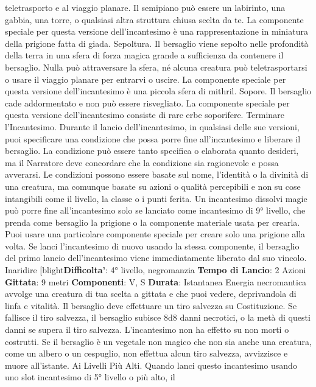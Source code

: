 \begin{multicols}{2}
teletrasporto e al viaggio planare. Il semipiano può
essere un labirinto, una gabbia, una torre, o qualsiasi
altra struttura chiusa scelta da te.
La componente speciale per questa versione
dell’incantesimo è una rappresentazione in miniatura
della prigione fatta di giada.
Sepoltura. Il bersaglio viene sepolto nelle profondità
della terra in una sfera di forza magica grande a
sufficienza da
contenere il bersaglio. Nulla può attraversare la sfera,
né alcuna creatura può teletrasportarsi o usare il
viaggio planare per entrarvi o uscire.
La componente speciale per questa versione
dell’incantesimo è una piccola sfera di mithril.
Sopore. Il bersaglio cade addormentato e non può
essere risvegliato. La componente speciale per questa
versione dell’incantesimo consiste di rare erbe
soporifere.
Terminare l’Incantesimo. Durante il lancio
dell’incantesimo, in qualsiasi delle sue versioni, puoi
specificare una condizione che possa porre fine
all’incantesimo e liberare il bersaglio. La condizione può
essere tanto specifica o elaborata quanto desideri, ma il
Narratore deve concordare che la condizione sia ragionevole
e possa avverarsi. Le condizioni possono essere
basate sul nome, l’identità o la divinità di una creatura,
ma comunque basate su azioni o qualità percepibili e
non su cose intangibili come il livello, la classe o i punti
ferita.
Un incantesimo dissolvi magie può porre fine
all’incantesimo solo se lanciato come incantesimo di 9°
livello, che prenda come bersaglio la prigione o la
componente materiale usata per crearla.
Puoi usare una particolare componente speciale per
creare solo una prigione alla volta. Se lanci
l’incantesimo di nuovo usando la stessa componente, il
bersaglio del primo lancio dell’incantesimo viene
immediatamente liberato dal suo vincolo.
Inaridire
[blight\textbf{Difficolta'}:
4° livello, negromanzia
\textbf{Tempo di Lancio}: 2 Azioni
\textbf{Gittata}: 9 metri
\textbf{Componenti}: V, S
\textbf{Durata}: Istantanea
Energia necromantica avvolge una creatura di tua
scelta a gittata e che puoi vedere, deprivandola di linfa
e vitalità. Il bersaglio deve effettuare un tiro salvezza su
Costituzione. Se fallisce il tiro salvezza, il bersaglio
subisce 8d8 danni necrotici, o la metà di questi danni se
supera il tiro salvezza. L’incantesimo non ha effetto su
non morti o costrutti.
Se il bersaglio è un vegetale non magico che non sia
anche una creatura, come un albero o un cespuglio,
non effettua alcun tiro salvezza, avvizzisce e muore
all’istante.
Ai Livelli Più Alti. Quando lanci questo incantesimo
usando uno slot incantesimo di 5° livello o più alto, il

\end{multicols}
